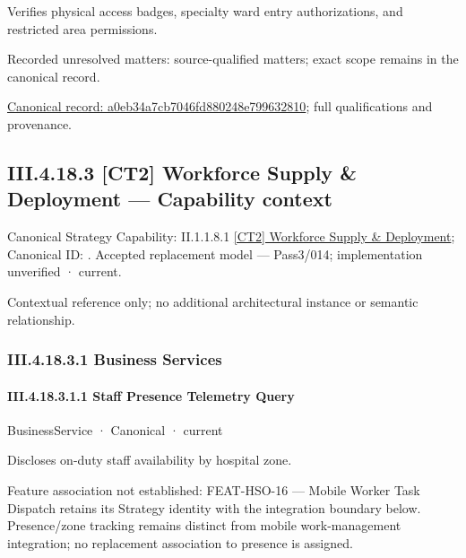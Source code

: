 Verifies physical access badges, specialty ward entry authorizations, and restricted area permissions.


{\small Recorded unresolved matters: source-qualified matters; exact scope remains in the canonical record.}\par
{\footnotesize \href{../../../../../../../continuum/business/business-function/a0eb34a7cb7046fd880248e799632810.md}{Canonical record: a0eb34a7cb7046fd880248e799632810}; full qualifications and provenance.}\par
\subsection*{III.4.18.3 [CT2] Workforce Supply \& Deployment — Capability context}
\label{navigation:III.4.18.3}

{\small Canonical Strategy Capability: II.1.1.8.1 \hyperref[element:eacad022ee104fb3a6b21791a7abf19f]{[CT2] Workforce Supply \& Deployment}; Canonical ID: \texttt{}. Accepted replacement model — Pass3/014; implementation unverified · current.}\par
Contextual reference only; no additional architectural instance or semantic relationship.\par
\subsubsection*{III.4.18.3.1 Business Services}
\label{navigation:III.4.18.3.1}

\paragraph*{III.4.18.3.1.1 Staff Presence Telemetry Query}
\label{navigation:III.4.18.3.1.1}

\label{element:b3cd0d8e40f44b9fa2b64367237345fa}
{\small BusinessService · Canonical · current}\par

Discloses on-duty staff availability by hospital zone.



Feature association not established: FEAT-HSO-16 — Mobile Worker Task Dispatch retains its Strategy identity with the integration boundary below. Presence/zone tracking remains distinct from mobile work-management integration; no replacement association to presence is assigned.


